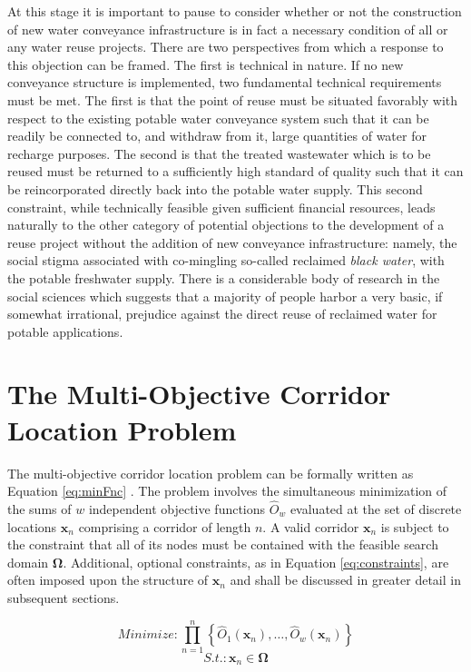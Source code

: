 At this stage it is important to pause to consider whether or not the construction of new water conveyance infrastructure is in fact a necessary condition of all or any water reuse projects. There are two perspectives from which a response to this objection can be framed. The first is technical in nature. If no new conveyance structure is implemented, two fundamental technical requirements must be met. The first is that the point of reuse must be situated favorably with respect to the existing potable water conveyance system such that it can be readily be connected to, and withdraw from it, large quantities of water for recharge purposes. The second is that the treated wastewater which is to be reused must be returned to a sufficiently high standard of quality such that it can be reincorporated directly back into the potable water supply. This second constraint, while technically feasible given sufficient financial resources, leads naturally to the other category of potential objections to the development of a reuse project without the addition of new conveyance infrastructure: namely, the social stigma associated with co-mingling so-called reclaimed \textit{black water}, with the potable freshwater supply. There is a considerable body of research in the social sciences which suggests that a majority of people harbor a very basic, if somewhat irrational, prejudice against the direct reuse of reclaimed water for potable applications. 
            
\section{The Multi-Objective Corridor Location Problem}
            
The multi-objective corridor location problem can be formally written as Equation \ref{eq:minFnc} \cite{Zhou2011}. The problem involves the simultaneous minimization of the sums of $w$ independent objective functions $\hat{O}_w$ evaluated at the set of discrete locations $\textbf{x}_n$ comprising a corridor of length $n$. A valid corridor $\textbf{x}_n$ is subject to the constraint that all of its nodes must be contained with the feasible search domain $\boldsymbol{\Omega}$. Additional, optional constraints, as in Equation \ref{eq:constraints}, are often imposed upon the structure of $\textbf{x}_n$ and shall be discussed in greater detail in subsequent sections.
            
            \begin{equation}
            Minimize: \prod\limits_{n=1}^n \left\{\hat{O}_1(\textbf{x}_n), \dots, \hat{O}_w(\textbf{x}_n)\right\}
            \label{eq:minFnc}
            \end{equation}
            \begin{equation}
            S.t.: \textbf{x}_n \in \boldsymbol\Omega
            \label{eq:constraints}
            \end{equation}
            
